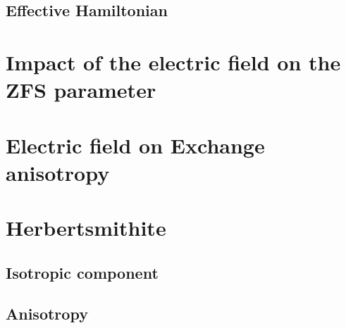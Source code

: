 \documentclass{article}
\begin{document}
\subsection{Effective Hamiltonian}

\section{Impact of the electric field on the ZFS parameter}

\section{Electric field on Exchange anisotropy}

\section{Herbertsmithite}

\subsection{Isotropic component}

\subsection{Anisotropy}
\end{document}
